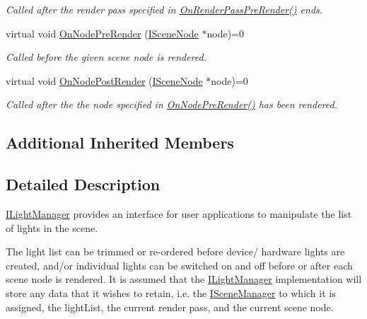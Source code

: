 \begin{DoxyCompactItemize}
\begin{DoxyCompactList}\small\item\em Called after the render pass specified in \hyperlink{classirr_1_1scene_1_1ILightManager_a56eaec6a697659f40b4f29b681fbdfad}{On\+Render\+Pass\+Pre\+Render()} ends. \end{DoxyCompactList}\item 
virtual void \hyperlink{classirr_1_1scene_1_1ILightManager_a23ae7bdf54613e6dd41d4138cb6f5edc}{On\+Node\+Pre\+Render} (\hyperlink{classirr_1_1scene_1_1ISceneNode}{I\+Scene\+Node} $\ast$node)=0
\begin{DoxyCompactList}\small\item\em Called before the given scene node is rendered. \end{DoxyCompactList}\item 
virtual void \hyperlink{classirr_1_1scene_1_1ILightManager_aa9e6195a3a783a97f440a4b947090ab0}{On\+Node\+Post\+Render} (\hyperlink{classirr_1_1scene_1_1ISceneNode}{I\+Scene\+Node} $\ast$node)=0
\begin{DoxyCompactList}\small\item\em Called after the the node specified in \hyperlink{classirr_1_1scene_1_1ILightManager_a23ae7bdf54613e6dd41d4138cb6f5edc}{On\+Node\+Pre\+Render()} has been rendered. \end{DoxyCompactList}\end{DoxyCompactItemize}
\subsection*{Additional Inherited Members}


\subsection{Detailed Description}
\hyperlink{classirr_1_1scene_1_1ILightManager}{I\+Light\+Manager} provides an interface for user applications to manipulate the list of lights in the scene. 

The light list can be trimmed or re-\/ordered before device/ hardware lights are created, and/or individual lights can be switched on and off before or after each scene node is rendered. It is assumed that the \hyperlink{classirr_1_1scene_1_1ILightManager}{I\+Light\+Manager} implementation will store any data that it wishes to retain, i.\+e. the \hyperlink{classirr_1_1scene_1_1ISceneManager}{I\+Scene\+Manager} to which it is assigned, the light\+List, the current render pass, and the current scene node. 

